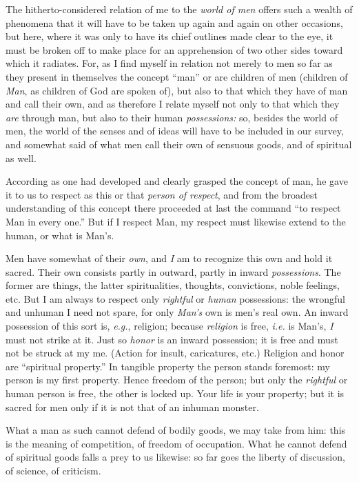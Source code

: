 The hitherto-considered relation of me to the \textit{world of men} offers 
such a wealth of phenomena that it will have to be taken up again and again on 
other occasions, but here, where it was only to have its chief outlines made 
clear to the eye, it must be broken off to make place for an apprehension of 
two other sides toward which it radiates. For, as I find myself in relation 
not merely to men so far as they present in themselves the concept ``man'' 
or are children of men (children of \textit{Man}, as children of God are 
spoken of), but also to that which they have of man and call their own, and as 
therefore I relate myself not only to that which they \textit{are} through 
man, but also to their human \textit{possessions:} so, besides the world of 
men, the world of the senses and of ideas will have to be included in our 
survey, and somewhat said of what men call their own of sensuous goods, and of 
spiritual as well.

According as one had developed and clearly grasped the concept of man, he gave 
it to us to respect as this or that \textit{person of respect}, and from the 
broadest understanding of this concept there proceeded at last the command 
``to respect Man in every one.'' But if I respect Man, my respect must 
likewise extend to the human, or what is Man's.

Men have somewhat of their \textit{own}, and \textit{I} am to recognize this 
own and hold it sacred. Their own consists partly in outward, partly in inward 
\textit{possessions}. The former are things, the latter spiritualities, 
thoughts, convictions, noble feelings, etc. But I am always to respect only 
\textit{rightful} or \textit{human} possessions: the wrongful and unhuman I 
need not spare, for only \textit{Man's} own is men's real own. An inward 
possession of this sort is, \textit{e.g.}, religion; because 
\textit{religion} is free, \textit{i.e.} is Man's, \textit{I} must not strike 
at it. Just so \textit{honor} is an inward possession; it is free and must not 
be struck at my me. (Action for insult, caricatures, etc.) Religion and honor 
are ``spiritual property.'' In tangible property the person stands foremost: 
my person is my first property. Hence freedom of the person; but only the 
\textit{rightful} or human person is free, the other is locked up. Your life 
is your property; but it is sacred for men only if it is not that of an 
inhuman monster.

What a man as such cannot defend of bodily goods, we may take from him: this 
is the meaning of competition, of freedom of occupation. What he cannot defend 
of spiritual goods falls a prey to us likewise: so far goes the liberty of 
discussion, of science, of criticism.

